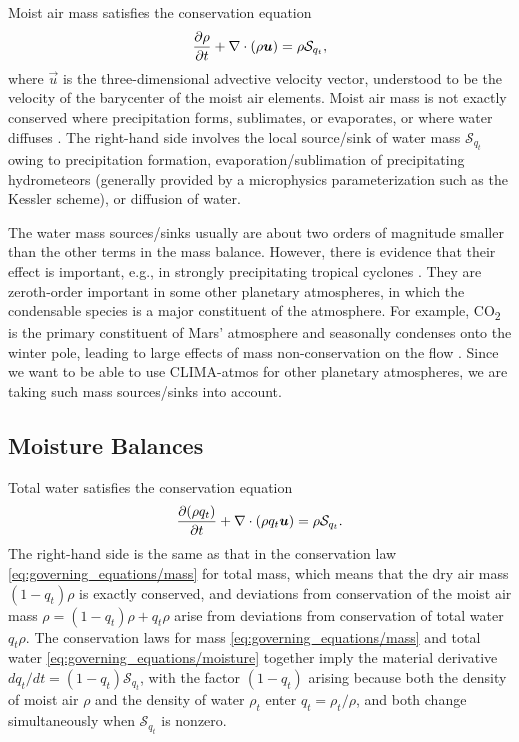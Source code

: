 \documentclass{article}
\begin{document}
Moist air mass satisfies the conservation equation
\begin{equation}
\frac{\partial \rho}{\partial t} + \nabla \cdot (\rho\boldsymbol{{u}}) = \rho \mathcal{S}_{q_t},
\label{eq:governing_equations/mass}
\end{equation}
where $\vec{u}$ is the three-dimensional advective velocity vector, understood to be the velocity of the barycenter of the moist air elements. Moist air mass is not exactly conserved where precipitation forms, sublimates, or evaporates, or where water diffuses \citep{Bott08a}. The  right-hand side involves the local source/sink of water mass $\mathcal{S}_{q_t}$ owing to precipitation formation, evaporation/sublimation of precipitating hydrometeors (generally provided by a microphysics parameterization such as the Kessler scheme), or diffusion of water. 

The water mass sources/sinks usually are about two orders of magnitude smaller than the other terms in the mass balance. However, there is evidence that their effect is important, e.g., in strongly precipitating tropical cyclones \citep{Qiu93a,Lackmann04a}. They are zeroth-order important in some other planetary atmospheres, in which the condensable species is a major constituent of the atmosphere. For example, CO\textsubscript{2} is the primary constituent of Mars' atmosphere and seasonally condenses onto the winter pole, leading to large effects of mass non-conservation on the flow \cite[e.g.,][]{Soto15a}. Since we want to be able to use CLIMA-atmos for other planetary atmospheres, we are taking such mass sources/sinks into account.

\subsection{Moisture Balances}

Total water satisfies the conservation equation
\begin{equation}
\frac{\partial (\rho q_t)}{\partial t} + \nabla \cdot (\rho q_t \boldsymbol{{u}}) = \rho \mathcal{S}_{q_t}.   
\label{eq:governing_equations/moisture}
\end{equation}
The right-hand side is the same as that in the conservation law \eqref{eq:governing_equations/mass} for total mass, which means that the dry air mass $(1-q_t)\rho$ is exactly conserved, and deviations from conservation of the moist air mass $\rho = (1-q_t)\rho + q_t \rho$ arise from deviations from conservation of total water $q_t\rho$. The conservation laws for mass \eqref{eq:governing_equations/mass} and total water \eqref{eq:governing_equations/moisture} together imply the material derivative $dq_t/dt = (1-q_t) \mathcal{S}_{q_t}$, with the factor $(1-q_t)$ arising because both the density of moist air $\rho$ and the density of water $\rho_t$ enter $q_t = \rho_t/\rho$, and both change simultaneously when $\mathcal{S}_{q_t}$ is nonzero.
\end{document}

